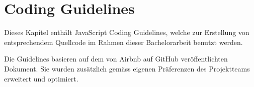 \chapter{Coding Guidelines}
\label{sec:coding-guidelines}
Dieses Kapitel enthält JavaScript Coding Guidelines, welche zur Erstellung von entsprechendem Quellcode im Rahmen dieser Bachelorarbeit benutzt werden.

Die Guidelines basieren auf dem von Airbnb \cite{Airbnb} auf GitHub veröffentlichten Dokument. Sie wurden zusätzlich gemäss eigenen Präferenzen \cite{JSGL} des Projektteams erweitert und optimiert.

